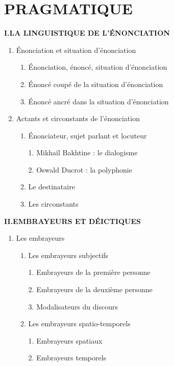 \chapter{PRAGMATIQUE}
\label{chapter-12}
\begin{keybox}
\small{}
\renewcommand{\thempfootnote}{校\arabic{editorialnote}}
\textbf{I.\quad LA LINGUISTIQUE DE L’ÉNONCIATION}
\begin{enumerate}[label=\arabic*.]
\item Énonciation et situation d’énonciation
\begin{enumerate}[label=\textcircled{\scriptsize\arabic*}]
\item Énonciation, énoncé, situation d’énonciation
\item Énoncé coupé de la situation d’énonciation
\item Énoncé ancré dans la situation d’énonciation
\end{enumerate}
\item Actants et circonstants de l’énonciation
\begin{enumerate}[label=\textcircled{\scriptsize\arabic*}]
\item Énonciateur, sujet parlant et locuteur\par 1. Mikhaïl Bakhtine : le dialogisme\par 2. Oswald Ducrot : la polyphonie
\item Le destinataire
\item Les circonstants
\end{enumerate}
\end{enumerate}
\textbf{II.\quad EMBRAYEURS ET DÉICTIQUES}
\begin{enumerate}[label=\arabic*.]
\item Les embrayeurs
\begin{enumerate}[label=\textcircled{\scriptsize\arabic*}]
\item Les embrayeurs subjectifs\par 1. Embrayeurs de la première personne\par 2. Embrayeurs de la deuxième personne\par 3. Modalisateurs du discours
\item Les embrayeurs spatio-temporels\par 1. Embrayeurs spatiaux\par 2. Embrayeurs temporels
\end{enumerate}

\end{enumerate}
\end{keybox}
